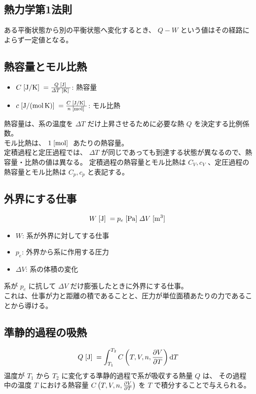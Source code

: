 \documentclass[a4paper,11pt]{jsarticle}
\newcommand{\braunit}[1]{\;\text{[}\unit[per-mode = symbol]{#1}\text{]}\;}
\begin{document}
\subsection*{熱力学第1法則}
ある平衡状態から別の平衡状態へ変化するとき、 $Q-W$ という値はその経路によらず一定値となる。
\cite[pp.37]{thermo}

\subsection*{熱容量とモル比熱}
\begin{itemize}
  \item $C\braunit{\J\per\K} = \frac{Q\braunit{\J}}{\varDelta T\braunit{\K}}$: 熱容量
  \item $c\braunit{\J\per\mole\per\K} = \frac{C\braunit{\J\per\K}}{n\braunit{\mole}}$: モル比熱
\end{itemize}
熱容量は、系の温度を $\varDelta T$ だけ上昇させるために必要な熱 $Q$ を決定する比例係数。\\
モル比熱は、 $1\braunit{\mole}$ あたりの熱容量。\\
定積過程と定圧過程では、 $\varDelta T$ が同じであっても到達する状態が異なるので、熱容量・比熱の値は異なる。
定積過程の熱容量とモル比熱は $C_V, c_V$ 、定圧過程の熱容量とモル比熱は $C_p, c_p$ と表記する。
\cite[pp.38]{thermo}

\subsection*{外界にする仕事}
\begin{align*}
  W\braunit{\J} = p_e\braunit{\Pa}\varDelta V\braunit{\m^3}
\end{align*}
\begin{itemize}
  \item $W$: 系が外界に対してする仕事
  \item $p_e$: 外界から系に作用する圧力
  \item $\varDelta V$: 系の体積の変化
\end{itemize}
系が $p_e$ に抗して $\varDelta V$ だけ膨張したときに外界にする仕事。\\
これは、仕事が力と距離の積であることと、圧力が単位面積あたりの力であることから導ける。
\cite[pp.46]{thermo}

\subsection*{準静的過程の吸熱}
\begin{align*}
  Q\braunit{\J} = \int_{T_1}^{T_2} C\left(T, V, n, \pdv{V}{T}\right)\dd{T}
\end{align*}
温度が $T_1$ から $T_2$ に変化する準静的過程で系が吸収する熱量 $Q$ は、
その過程中の温度 $T$ における熱容量 $C\left(T, V, n, \pdv{V}{T}\right)$ を $T$ で積分することで与えられる。
\cite[pp.44]{thermo}
\end{document}
